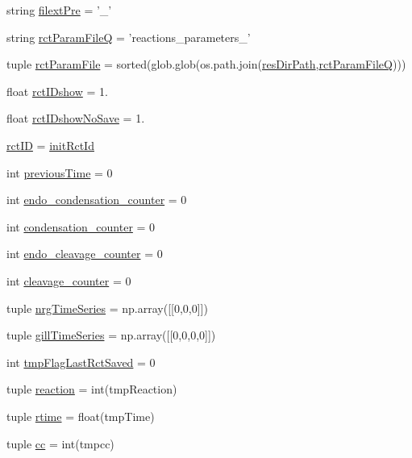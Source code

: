 \begin{DoxyCompactItemize}
\item 
string \hyperlink{a00096_a60ff937c050eef601bd84134d1913d8a}{filext\-Pre} = '\-\_\-'
\item 
string \hyperlink{a00096_aff5ea475bb2c78122a231a915dc88e89}{rct\-Param\-File\-Q} = 'reactions\-\_\-parameters\-\_\-'
\item 
tuple \hyperlink{a00096_ac700504fc38d7684ec9fae104d7d90a3}{rct\-Param\-File} = sorted(glob.\-glob(os.\-path.\-join(\hyperlink{a00096_a9ededb3cd7c63befde39ad68e5f9e006}{res\-Dir\-Path},\hyperlink{a00096_aff5ea475bb2c78122a231a915dc88e89}{rct\-Param\-File\-Q})))
\item 
float \hyperlink{a00096_a8a780c7762bc8a40f296abfd474b7ce4}{rct\-I\-Dshow} = 1.
\item 
float \hyperlink{a00096_a3942b0b71d5893c244f7f49929db336b}{rct\-I\-Dshow\-No\-Save} = 1.
\item 
\hyperlink{a00096_a78ffc7d3b69c53ec5389a151e7fdcb83}{rct\-I\-D} = \hyperlink{a00096_a212643643fc6b002e8797f16633bb16d}{init\-Rct\-Id}
\item 
int \hyperlink{a00096_aff96a31e98ac46cb47a67b74f5d87351}{previous\-Time} = 0
\item 
int \hyperlink{a00096_a20a51ec68106a5a97fb3a72f417ca4e6}{endo\-\_\-condensation\-\_\-counter} = 0
\item 
int \hyperlink{a00096_a144441bdbe6e835849cf165ea2946848}{condensation\-\_\-counter} = 0
\item 
int \hyperlink{a00096_af5702a39b502da88dde8c38417a0efbd}{endo\-\_\-cleavage\-\_\-counter} = 0
\item 
int \hyperlink{a00096_a0dd6730b063ac11ae4620c4a0778f6d9}{cleavage\-\_\-counter} = 0
\item 
tuple \hyperlink{a00096_ad4d4abc783f2f7f8d1084b1144b4fe2f}{nrg\-Time\-Series} = np.\-array(\mbox{[}\mbox{[}0,0,0\mbox{]}\mbox{]})
\item 
tuple \hyperlink{a00096_a99669fe823cebc560b46c3746f9183e7}{gill\-Time\-Series} = np.\-array(\mbox{[}\mbox{[}0,0,0,0\mbox{]}\mbox{]})
\item 
int \hyperlink{a00096_a6e8aff976901d1424dd1ff00c3387014}{tmp\-Flag\-Last\-Rct\-Saved} = 0
\item 
tuple \hyperlink{a00096_a58c3618ec28f27dfbf09e0d3aba05bc7}{reaction} = int(tmp\-Reaction)
\item 
tuple \hyperlink{a00096_a162a08b0497058c76e7e885c03a01336}{rtime} = float(tmp\-Time)
\item 
tuple \hyperlink{a00096_a67fcb77a15f51e94c98bb48b05865715}{cc} = int(tmpcc)

\end{DoxyCompactItemize}
